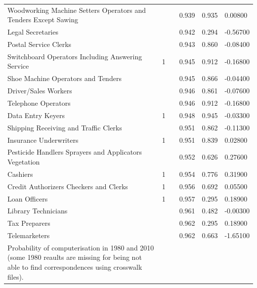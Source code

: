 \documentclass[11pt]{report}
\numberwithin{equation}{chapter}
\begin{document}
\begin{spacing}{2}
\begin{longtable}{ p{} p{} p{}  p{}  p{}  p{} }
Woodworking Machine Setters Operators and Tenders Except Sawing	&		&	&	0.939	&	0.935	&	0.00800	\\
Legal Secretaries	&		&	&	0.942	&	0.294	&	-0.56700	\\
Postal Service Clerks	&		&	&	0.943	&	0.860	&	-0.08400	\\
Switchboard Operators Including Answering Service	&	1	&	&	0.945	&	0.912	&	-0.16800	\\
Shoe Machine Operators and Tenders	&		&	&	0.945	&	0.866	&	-0.04400	\\
Driver/Sales Workers	&		&	&	0.946	&	0.861	&	-0.07600	\\
Telephone Operators	&		&	&	0.946	&	0.912	&	-0.16800	\\
Data Entry Keyers	&	1	&	&	0.948	&	0.945	&	-0.03300	\\
Shipping Receiving and Traffic Clerks	&		&	&	0.951	&	0.862	&	-0.11300	\\
Insurance Underwriters	&	1	&	&	0.951	&	0.839	&	0.02800	\\
Pesticide Handlers Sprayers and Applicators Vegetation	&		&	&	0.952	&	0.626	&	0.27600	\\
Cashiers	&	1	&	&	0.954	&	0.776	&	0.31900	\\
Credit Authorizers Checkers and Clerks	&	1	&	&	0.956	&	0.692	&	0.05500	\\
Loan Officers	&	1	&	&	0.957	&	0.295	&	0.18900	\\
Library Technicians	&		&	&	0.961	&	0.482	&	-0.00300	\\
Tax Preparers	&		&	&	0.962	&	0.295	&	0.18900	\\
Telemarketers	&		&	&	0.962	&	0.663	&	-1.65100	\\
\hline 

\caption{Probability of computerisation in 1980 and 2010 \\(some 1980 reaults are missing for being not able to find correspondences using crosswalk files).} 
\label{tab:myfirstlongtable}


\end{longtable}
\endgroup


\end{spacing}
\end{document}

